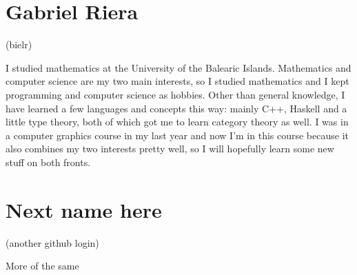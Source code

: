 \documentclass[11pt]{amsart}
\begin{document}
\medskip

\section*{Gabriel Riera}
(bielr)

I studied mathematics at the University of the Balearic Islands. Mathematics
and computer science are my two main interests, so I studied mathematics and I
kept programming and computer science as hobbies. Other than general knowledge,
I have learned a few languages and concepts this way: mainly C++, Haskell and a
little type theory, both of which got me to learn category theory as well. I
was in a computer graphics course in my last year and now I'm in this course
because it also combines my two interests pretty well, so I will hopefully
learn some new stuff on both fronts.

\medskip

\section*{Next name here}
(another github login)

More of the same
\end{document}

